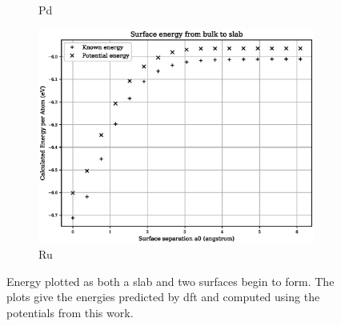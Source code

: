 \begin{figure}[htb]
\begin{subfigure}{.48\textwidth}
  \caption{Pd}
  \label{fig:fepd-pd-surface}
\end{subfigure}
\begin{subfigure}{.48\textwidth}
  \centering
  \includegraphics[width=.94\linewidth]{chapters/potentials_fe_pd_ru/feru_potential/ru_surface_energy.eps} 
  \caption{Ru}
  \label{fig:feru-ru-surface}
\end{subfigure}
\caption{Energy plotted as both a slab and two surfaces begin to form.  The plots give the energies predicted by \acrshort{dft} and computed using the potentials from this work.}
\label{fig:fepd-feru-surface}
\end{figure}


